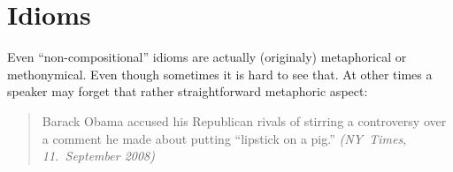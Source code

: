 \chapter{Idioms}
Even ``non-compositional'' idioms are actually (originaly) metaphorical or methonymical.  Even though sometimes it is hard to see that. At other times a speaker may forget that rather straightforward metaphoric aspect:

\begin{quote}
Barack Obama accused his Republican rivals of stirring a controversy over a comment he made about putting “lipstick on a pig.” \emph{(NY~Times, 11.~September 2008)}
\end{quote}